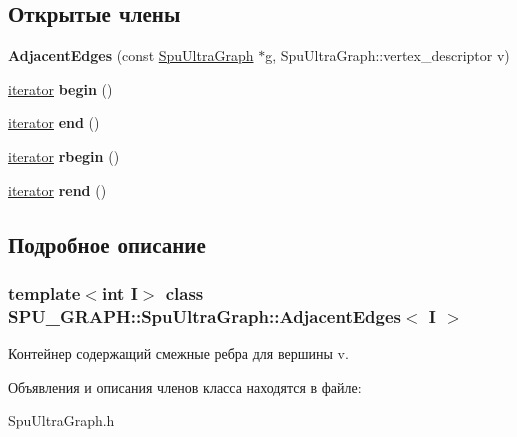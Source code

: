 \subsection*{Открытые члены}
\begin{DoxyCompactItemize}
\item 
\mbox{\label{class_s_p_u___g_r_a_p_h_1_1_spu_ultra_graph_1_1_adjacent_edges_ab2f7687136e079ac52f3c151dccbf8a5}} 
{\bfseries Adjacent\+Edges} (const \hyperlink{class_s_p_u___g_r_a_p_h_1_1_spu_ultra_graph}{Spu\+Ultra\+Graph} $\ast$g, Spu\+Ultra\+Graph\+::vertex\+\_\+descriptor v)
\item 
\mbox{\label{class_s_p_u___g_r_a_p_h_1_1_spu_ultra_graph_1_1_adjacent_edges_a2a1ec5c277a774b0978909916bf31917}} 
\hyperlink{class_s_p_u___g_r_a_p_h_1_1_spu_ultra_graph_1_1_adjacent_edges_iterator}{iterator} {\bfseries begin} ()
\item 
\mbox{\label{class_s_p_u___g_r_a_p_h_1_1_spu_ultra_graph_1_1_adjacent_edges_aa8fd47a34331b8acfc3a1c521117a871}} 
\hyperlink{class_s_p_u___g_r_a_p_h_1_1_spu_ultra_graph_1_1_adjacent_edges_iterator}{iterator} {\bfseries end} ()
\item 
\mbox{\label{class_s_p_u___g_r_a_p_h_1_1_spu_ultra_graph_1_1_adjacent_edges_aec67d36c50e3a8d60009bf1235649592}} 
\hyperlink{class_s_p_u___g_r_a_p_h_1_1_spu_ultra_graph_1_1_adjacent_edges_iterator}{iterator} {\bfseries rbegin} ()
\item 
\mbox{\label{class_s_p_u___g_r_a_p_h_1_1_spu_ultra_graph_1_1_adjacent_edges_a80cb7b7abd364fd292595a2e3e00f83e}} 
\hyperlink{class_s_p_u___g_r_a_p_h_1_1_spu_ultra_graph_1_1_adjacent_edges_iterator}{iterator} {\bfseries rend} ()
\end{DoxyCompactItemize}


\subsection{Подробное описание}
\subsubsection*{template$<$int I$>$\newline
class S\+P\+U\+\_\+\+G\+R\+A\+P\+H\+::\+Spu\+Ultra\+Graph\+::\+Adjacent\+Edges$<$ I $>$}

Контейнер содержащий смежные ребра для вершины v. 

Объявления и описания членов класса находятся в файле\+:\begin{DoxyCompactItemize}
\item 
Spu\+Ultra\+Graph.\+h\end{DoxyCompactItemize}
